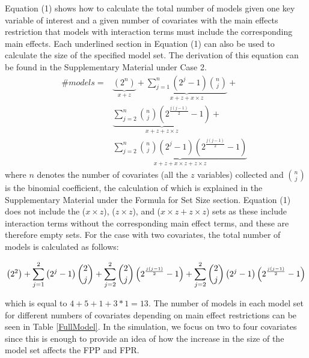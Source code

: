 

Equation (1) shows how to calculate the total number of models given one key variable of interest and a given number of covariates with the main effects restriction that models with interaction terms must include the corresponding main effects. Each underlined section in Equation (1) can also be used to calculate the size of the specified model set. The derivation of this equation can be found in the Supplementary Material under Case 2. \\

\begin{equation} 
\begin{aligned}
\#models={} & \underbrace{\left(2^n\right)}_{x + z}+\underbrace{\sum^n_{j=1}{\left(2^j-1\right)\binom{n}{j}}}_{x + z + x \times z} + \\ 
& \underbrace{\sum^n_{j=2}{\binom{n}{j}\left(2^{\frac{j\left(j-1\right)}{2}}-1\right)}}_{x + z + z \times z} + \\
& \underbrace{\sum^n_{j=2}{\binom{n}{j}\left(2^j-1\right)\left(2^{\frac{j\left(j-1\right)}{2}}-1\right)}}_{x + z + x \times z + z \times z}\ \  
\end{aligned}
\end{equation} 
where $n$ denotes the number of covariates (all the $z$ variables) collected and $\binom{n}{j}$ is the binomial coefficient, the calculation of which is explained in the Supplementary Material under the Formula for Set Size section.
Equation (1) does not include the ($x \times z$), ($z \times z$), and ($x \times z + z \times z$) sets as these include interaction terms without the corresponding main effect terms, and these are therefore empty sets. For the case with two covariates, the total number of models is calculated as follows:

\begin{equation*}
\centering
\left(2^2\right)+
\sum^2_{j=1}{\left(2^j-1\right) \binom{2}{j}}+
\sum^2_{j=2}{\binom{2}{j}\left(2^{\frac{j\left(j-1\right)}{2}}-1\right)}+  
\sum^2_{j=2}{\binom{2}{j}\left(2^j-1\right)\left(2^{\frac{j\left(j-1\right)}{2}}-1\right)}
\end{equation*}

which is equal to $4+5+1+3*1=13$. The number of models in each model set for different numbers of covariates depending on main effect restrictions can be seen in Table \ref{FullModel}. In the simulation, we focus on two to four covariates since this is enough to provide an idea of how the increase in the size of the model set affects the FPP and FPR.  \\

